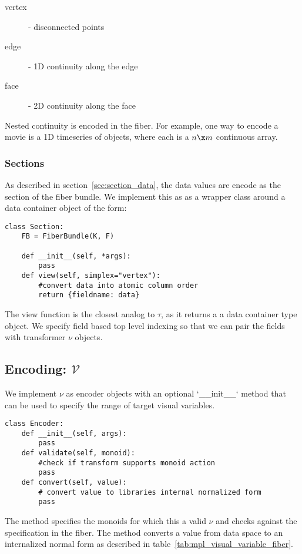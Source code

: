 \documentclass[../main.tex]{subfiles}
\begin{document}
\begin{description}
    \item[vertex] - disconnected points
    \item[edge] - 1D continuity along the edge
    \item[face] - 2D continuity along the face
\end{description}
Nested continuity is encoded in the fiber. For example, one way to encode a movie is a 1D timeseries of  objects, where each  is a $n\x m$ continuous array. 

\subsubsection{Sections}
As described in section~\ref{sec:section_data}, the data values are encode as the section of the fiber bundle. We implement this as as a wrapper class around a data container object of the form:
\begin{verbatim}
class Section:
    FB = FiberBundle(K, F)

    def __init__(self, *args):
        pass
    def view(self, simplex="vertex"):
        #convert data into atomic column order 
        return {fieldname: data}
\end{verbatim}

The view function is the closest analog to $\tau$, as it returns a a data container type object. We specify field based top level indexing so that we can pair the fields with transformer $\nu$ objects. 

\subsection{Encoding: $\mathcal{V}$}
We implement $\nu$ as encoder objects with an optional `__init__` method that can be used to specify the range of target visual variables. 

\begin{verbatim}
class Encoder:
    def __init__(self, args):
        pass
    def validate(self, monoid):
        #check if transform supports monoid action
        pass
    def convert(self, value):
        # convert value to libraries internal normalized form
        pass
\end{verbatim}

The  method specifies the monoids for which this a valid $\nu$ and checks against the specification in the fiber. The  method converts a value from data space to an internalized normal form as described in table~\ref{tab:mpl_visual_variable_fiber}.  
\end{document}
